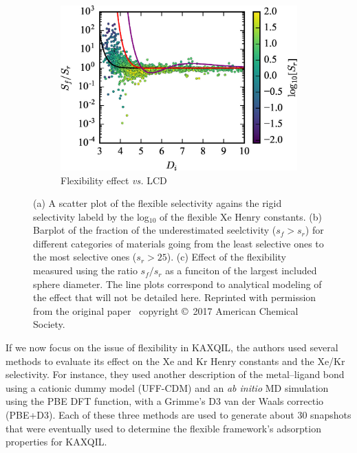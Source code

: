 \documentclass[main]{subfiles}
\begin{document}
\begin{figure}[ht]
\begin{subfigure}[b]{0.32\textwidth}
    \includegraphics[width=\textwidth]{figures/6-perspectives/s_ratio_LCD.jpg}
    \caption{Flexibility effect \emph{vs.} LCD}
  \end{subfigure}
  \caption{ (a) A scatter plot of the flexible selectivity agains the rigid selectivity labeld by the log$_10$ of the flexible Xe Henry constants. (b) Barplot of the fraction of the underestimated seelctivity ($s_f>s_r$) for different categories of materials going from the least selective ones to the most selective ones ($s_r>25$). (c) Effect of the flexibility measured using the ratio $s_f/s_r$ as a funciton of the largest included sphere diameter. The line plots correspond to analytical modeling of the effect that will not be detailed here. Reprinted with permission from the original paper~\cite{Witman_2017} copyright \copyright\ 2017 American Chemical Society. }\label{fgr:flexibility_study}
\end{figure}

If we now focus on the issue of flexibility in KAXQIL, the authors used several methods to evaluate its effect on the Xe and Kr Henry constants and the Xe/Kr selectivity. For instance, they used another description of the metal--ligand bond using a cationic dummy model (UFF-CDM) and an \emph{ab initio} MD simulation using the PBE DFT function,\autocite{Perdew_1996} with a Grimme's D3 van der Waals correctio\autocite{Grimme_2010} (PBE+D3). Each of these three methods are used to generate about $30$ snapshots that were eventually used to determine the flexible framework's adsorption properties for KAXQIL.
\end{document}
